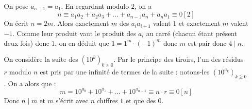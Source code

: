 \begin{sol}
On pose $a_{n+1}=a_1$.
En regardant modulo $2$, on a $$n\equiv a_1a_2+a_2a_3+...+a_{n-1}a_n+a_na_1\equiv 0[2]$$
On écrit $n=2m$. Alors exactement $m$ des $a_ia_{i+1}$ valent $1$ et exactement $m$ valent $-1$.
Comme leur produit vaut le produit des $a_i$ au carré (chacun étant présent deux fois) donc $1$, on en déduit que $1=1^m\cdot(-1)^m$ donc $m$ est pair donc $4\mid n$.
\end{sol}


\begin{sol}
On considère la suite des $(10^k)_{k\ge0}$. Par le principe des tiroirs, l'un des résidus $r$ modulo $n$ est pris par une infinité de termes de la suite : notons-les $(10^{a_k})_{k\ge0}$. On a alors que : $$m=10^{a_0}+10^{a_1}+\dots+10^{a_{n-1}}\equiv n\cdot r\equiv0[n]$$
Donc $n\mid m$ et $m$ s'écrit avec $n$ chiffres $1$ et que des $0$.
\end{sol}
